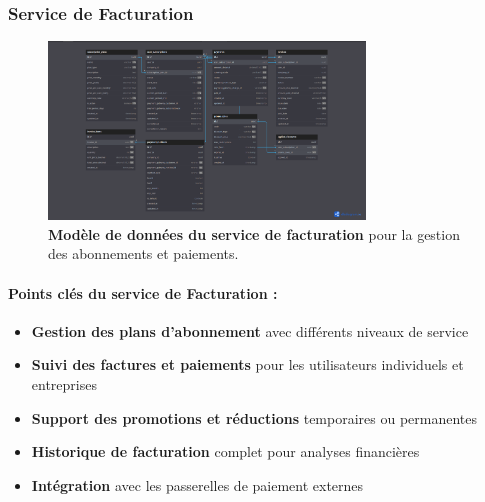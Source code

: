 \subsubsection{Service de Facturation}
\begin{figure}[H]
  \centering
  \includegraphics[width=0.75\textwidth,keepaspectratio]{week_1_img/services_db_screanshots/Screenshot 2025-06-06 at 15-05-28 Billing_and_Subscription_Service.pdf.png}
  \caption{\textbf{Modèle de données du service de facturation} pour la gestion des abonnements et paiements.}
  \label{fig:billing_service}
\end{figure}

\small
\paragraph{Points clés du service de Facturation :}
\begin{itemize}[leftmargin=*,noitemsep,topsep=0pt]
  \item \textbf{Gestion des plans d'abonnement} avec différents niveaux de service
  \item \textbf{Suivi des factures et paiements} pour les utilisateurs individuels et entreprises
  \item \textbf{Support des promotions et réductions} temporaires ou permanentes
  \item \textbf{Historique de facturation} complet pour analyses financières
  \item \textbf{Intégration} avec les passerelles de paiement externes
\end{itemize}
\normalsize

